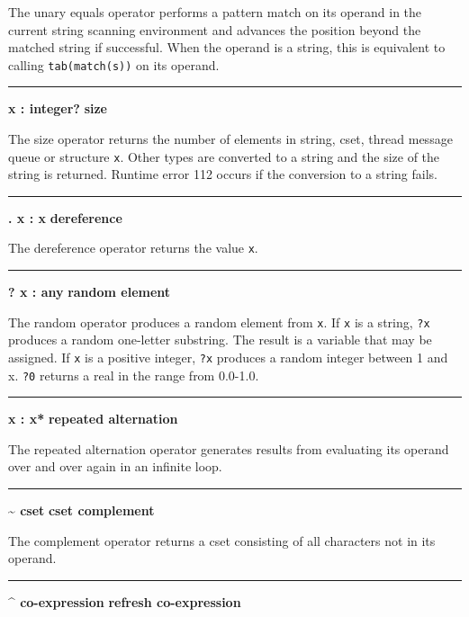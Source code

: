 \noindent
{}The unary equals operator
performs a pattern match on its operand in the current string scanning
environment and advances the position beyond the matched string
if successful.
When the operand is a string, this is
equivalent to calling \texttt{tab(match(s))} on its operand.

\bigskip\hrule\vspace{0.1cm}
\noindent
{\bf * x : integer? } \hfill {\bf size}

\noindent
The size operator returns the number of elements in
string, cset, thread message queue or structure \texttt{x}.
Other types are converted to a string and the size of the string is returned.
Runtime error 112 occurs if the conversion to a string fails.

\bigskip\hrule\vspace{0.1cm}
\noindent
{\bf . x : x } \hfill {\bf dereference}

\noindent
The dereference operator returns the value
\texttt{x}.

\bigskip\hrule\vspace{0.1cm}
\noindent
{\bf ? x : any } \hfill {\bf random element}

\noindent
The random operator produces a random element
from \texttt{x}. If \texttt{x} is a string, \texttt{?x} produces a
random one-letter substring. The result is a variable that may be
assigned. If \texttt{x} is a positive integer, \texttt{?x} produces a
random integer between 1 and x.  \texttt{?0} returns a real in the
range from 0.0-1.0.

\bigskip\hrule\vspace{0.1cm}
\noindent
{\bf {\textbar} x : x* } \hfill {\bf repeated alternation}

\noindent
The repeated alternation operator generates
results from evaluating its operand over and over again in an infinite
loop.

\bigskip\hrule\vspace{0.1cm}
\noindent
{\bf \~{} cset } \hfill {\bf cset complement}

\noindent
The complement operator returns a cset
consisting of all characters not in its operand.

\bigskip\hrule\vspace{0.1cm}
\noindent
{\bf \^{} co{}-expression } \hfill {\bf refresh co{}-expression}


